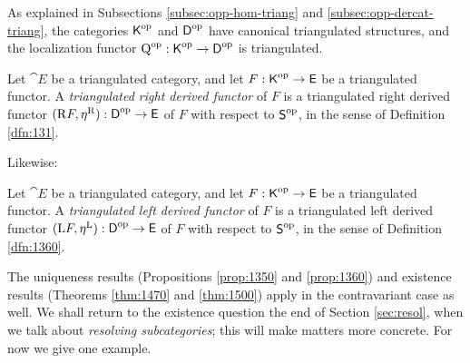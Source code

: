 As explained in Subsections \ref{subsec:opp-hom-triang} and 
\ref{subsec:opp-dercat-triang}, the categories 
$\operatorname{\mathsf{K}}^{\mathrm{op}}$ and $\operatorname{\mathsf{D}}^{\mathrm{op}}$ 
have canonical triangulated structures, and the localization functor 
$\operatorname{Q}^{\mathrm{op}} : \operatorname{\mathsf{K}}^{\mathrm{op}} \to \operatorname{\mathsf{D}}^{\mathrm{op}}$
is triangulated. 

\begin{dfn} \label{dfn:2356}
Let $\cat{E}$ be a triangulated category, and let 
$F : \operatorname{\mathsf{K}}^{\mathrm{op}} \to \operatorname{\mathsf{E}}$
be a triangulated functor.  
A {\em triangulated right derived functor} of $F$ is a triangulated 
right derived functor 
$(\mathrm{R} F, \eta^{\mathrm{R}}) : \operatorname{\mathsf{D}}^{\mathrm{op}} \to \operatorname{\mathsf{E}}$
of $F$ with respect to $\operatorname{\mathsf{S}}^{\mathrm{op}}$, in the sense 
of Definition \ref{dfn:131}. 
\end{dfn}

Likewise:

\begin{dfn} \label{dfn:2357} 
Let $\cat{E}$ be a triangulated category, and let 
$F : \operatorname{\mathsf{K}}^{\mathrm{op}} \to \operatorname{\mathsf{E}}$ 
be a triangulated functor. A {\em triangulated left derived functor} of $F$ is 
a triangulated left derived functor 
$(\mathrm{L} F, \eta^{\mathrm{L}}) : \operatorname{\mathsf{D}}^{\mathrm{op}} \to \operatorname{\mathsf{E}}$
of $F$ with respect to $\operatorname{\mathsf{S}}^{\mathrm{op}}$, in the sense 
of Definition \ref{dfn:1360}. 
\end{dfn}

The uniqueness results (Propositions \ref{prop:1350} and \ref{prop:1360})
and existence results (Theorems \ref{thm:1470} and \ref{thm:1500}) 
apply in the contravariant case as well. We shall return to the existence 
question the end of Section \ref{sec:resol}, when we talk about {\em 
resolving subcategories}; this will make matters more concrete. 
For now we give one example. 

